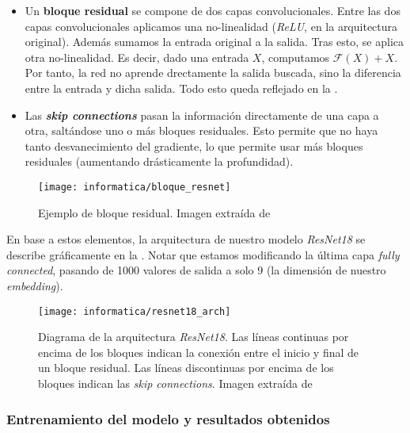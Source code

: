 \begin{itemize}
    \item Un \textbf{bloque residual} se compone de dos capas convolucionales. Entre las dos capas convolucionales aplicamos una no-linealidad (\textit{ReLU}, en la arquitectura original). Además sumamos la entrada original a la salida. Tras esto, se aplica otra no-linealidad. Es decir, dado una entrada $X$, computamos $\mathcal{F}(X) + X$. Por tanto, la red no aprende drectamente la salida buscada, sino la diferencia entre la entrada y dicha salida. Todo esto queda reflejado en la .
    \item Las \textbf{\textit{skip connections}} pasan la información directamente de una capa a otra, saltándose uno o más bloques residuales. Esto permite que no haya tanto desvanecimiento del gradiente, lo que permite usar más bloques residuales (aumentando drásticamente la profundidad).
\end{itemize}

\begin{figure}[hbt]
    \centering
    \texttt{[image: informatica/bloque\_resnet]}
    \caption{Ejemplo de bloque residual. Imagen extraída de \cite{informatica:resnet_original_paper}}
    \label{img:ejemplo_bloque_resnet}
\end{figure}

En base a estos elementos, la arquitectura de nuestro modelo \textit{ResNet18} se describe gráficamente en la . Notar que estamos modificando la última capa \textit{fully connected}, pasando de 1000 valores de salida a solo 9 (la dimensión de nuestro \textit{embedding}).

\begin{figure}[!hbt]
    \centering
    \texttt{[image: informatica/resnet18\_arch]}
    \caption{Diagrama de la arquitectura \textit{ResNet18}. Las líneas continuas por encima de los bloques indican la conexión entre el inicio y final de un bloque residual. Las líneas discontinuas por encima de los bloques indican las \textit{skip connections}. Imagen extraída de \cite{informatica:resnet18_arch_web}}
    \label{img:arquitectura_resnet_18}
\end{figure}

\subsubsection{Entrenamiento del modelo y resultados obtenidos} \label{isec:entrenamiento_mejor_modelo}

